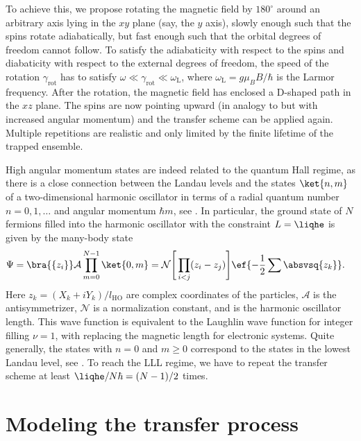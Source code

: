 To achieve this, we propose rotating the magnetic field by $180^\circ$ around an arbitrary axis lying in the $xy$ plane (say, the $y$ axis), slowly enough such that the spins rotate adiabatically, but fast enough such that the orbital degrees of freedom cannot follow. To satisfy the adiabaticity with respect to the spins and diabaticity with respect to the external degrees of freedom, the speed of the rotation $\gamma_\text{rot}$ has to satisfy
$\omega \ll \gamma_\text{rot} \ll \omega_\text{L}$, where $\omega_\text{L}=g\mu_B B/\hbar$ is the Larmor frequency. After the rotation, the magnetic field has enclosed a \textsf{D}-shaped path in the $xz$ plane. The spins are now pointing upward (in analogy to  but with
increased angular momentum) and the transfer scheme can be applied again. Multiple repetitions are realistic and only limited by the finite lifetime of the trapped ensemble.

High angular momentum states are indeed related to the quantum Hall regime, as there is a close connection between the Landau levels and the states $\ket{n,m}$ of a two-dimensional harmonic oscillator in terms of a radial quantum number $n=0,1,\dots$ and angular momentum $\hbar m$, see . In particular, the ground state of $N$ fermions filled into the harmonic oscillator with the constraint $L=\liqhe$ is given by the many-body state
\begin{align}
\Psi&= \bra{\{z_i\}}\mathcal{A} \prod_{m=0}^{N-1} \ket{0,m} = \mathcal{N}\Bigg[\prod_{i<j} (z_i-z_j) \Bigg] \ef{-\frac{1}{2}\sum\absvsq{z_k}}.
\end{align}
Here $z_k=(X_k+i Y_k)/l_\text{HO}$ are complex coordinates of the particles, $\mathcal{A}$ is the antisymmetrizer, $\mathcal{N}$ is a normalization constant, and  is the harmonic oscillator length. This wave function is equivalent to the Laughlin wave function for integer filling $\nu=1$, with    replacing the magnetic length  for electronic systems. Quite generally, the states with $n=0$ and $m\ge 0$ correspond to the states in the lowest Landau level, see .
To reach the LLL regime, we have to repeat the transfer scheme at least $\liqhe/N\hbar=(N-1)/2$ times.

\section{Modeling the transfer process}

